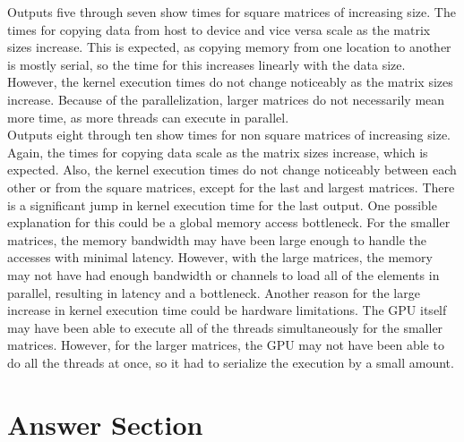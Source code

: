 \documentclass{article}
\begin{document}
Outputs five through seven show times for square matrices of increasing size. The times for copying data from host to device and vice versa scale as the matrix sizes increase. This is expected, as copying memory from one location to another is mostly serial, so the time for this increases linearly with the data size. However, the kernel execution times do not change noticeably as the matrix sizes increase. Because of the parallelization, larger matrices do not necessarily mean more time, as more threads can execute in parallel. \\

Outputs eight through ten show times for non square matrices of increasing size. Again, the times for copying data scale as the matrix sizes increase, which is expected. Also, the kernel execution times do not change noticeably between each other or from the square matrices, except for the last and largest matrices. There is a significant jump in kernel execution time for the last output. One possible explanation for this could be a global memory access bottleneck. For the smaller matrices, the memory bandwidth may have been large enough to handle the accesses with minimal latency. However, with the large matrices, the memory may not have had enough bandwidth or channels to load all of the elements in parallel, resulting in latency and a bottleneck. Another reason for the large increase in kernel execution time could be hardware limitations. The GPU itself may have been able to execute all of the threads simultaneously for the smaller matrices. However, for the larger matrices, the GPU may not have been able to do all the threads at once, so it had to serialize the execution by a small amount.\\ 

\section{Answer Section}
\end{document}
